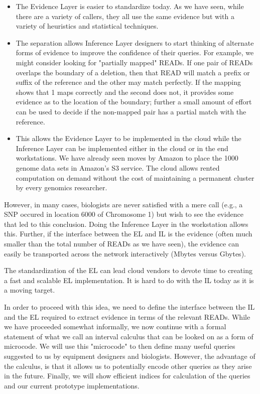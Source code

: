 \documentclass[10pt,fullpage]{article}
\begin{document}
\begin{itemize}
\item The Evidence Layer is easier to standardize today.  As we have
seen, while there are a variety of callers, they all use the same
evidence but with a variety of heuristics and statistical techniques.
\item The separation allows Inference Layer designers to start
thinking of alternate forms of evidence to improve the confidence of
their queries.  For example, we might consider looking for 
"partially mapped" READs.  If one pair of READs overlaps the boundary
of a deletion, then that READ will match a prefix or suffix of 
the reference and the other may match perfectly.  If the mapping
shows that 1 maps correctly and the second does not, it provides
some evidence as to the location of the boundary; further a small
amount of effort can be used to decide if the non-mapped pair
has a partial match with the reference.
\item This allows the Evidence Layer to be implemented in the cloud
while the Inference Layer can be implemented either in the cloud
or in the end workstations.   We have already seen moves by Amazon
to place the 1000 genome data sets in Amazon's S3 service.  The
cloud allows rented computation on demand without the cost of
maintaining a permanent cluster by every genomics researcher.  
\end{itemize}

However, in many cases, biologists are never satisfied with a mere
call (e.g., a SNP occured in location 6000 of Chromosome 1) but 
wish to see the evidence that led to this conclusion.   Doing the
Inference Layer in the workstation allows this.  Further, if the
interface between the EL and IL is the evidence (often much smaller
than the total number of READs as we have seen), the evidence can
easily be transported across the network interactively (Mbytes
versus Gbytes).  

The standardization of the EL can lead cloud vendors to devote 
time to creating a fast and scalable EL implementation.  It is
hard to do with the IL today as it is a moving target.

In order to proceed with this idea, we need to define the interface
between the IL and the EL required to extract evidence in terms of
the relevant READs.  While we have proceeded somewhat informally,
we now continue with a formal statement of what we call an interval
calculus  that can be looked on as a form of microcode.  We will
use this "microcode" to then define many useful queries suggested
to us by equipment designers and biologists.   However, the advantage
of the calculus, is that it allows us to potentially encode
other queries as they arise in the future.  Finally, we will show
efficient indices for calculation of the queries and our 
current prototype implementations.
 
\end{document}
